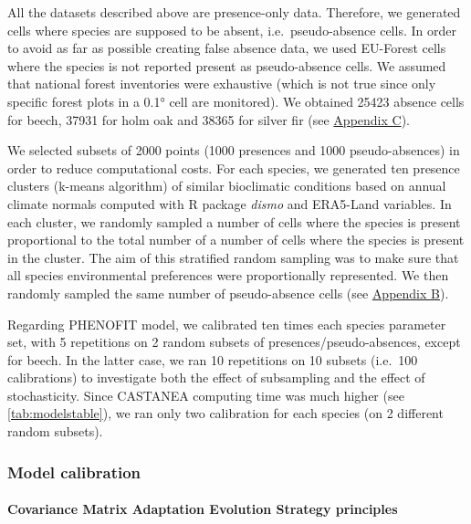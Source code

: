 All the datasets described above are presence-only data. Therefore, we
generated cells where species are supposed to be absent,
i.e.~pseudo-absence cells. In order to avoid as far as possible creating
false absence data, we used EU-Forest cells where the species is not
reported present as pseudo-absence cells. We assumed that national
forest inventories were exhaustive (which is not true since only
specific forest plots in a 0.1° cell are monitored). We obtained 25423
absence cells for beech, 37931 for holm oak and 38365 for silver fir
(see \hyperref[chap1:appendixC]{Appendix C}).

We selected subsets of 2000 points (1000 presences and 1000
pseudo-absences) in order to reduce computational costs. For each
species, we generated ten presence clusters (k-means algorithm) of
similar bioclimatic conditions based on annual climate normals computed
with R package \emph{dismo} \citep{Hijmans2021} and ERA5-Land variables. In each cluster, we
randomly sampled a number of cells where the species is present
proportional to the total number of a number of cells where the species
is present in the cluster. The aim of this stratified random sampling
was to make sure that all species environmental preferences were
proportionally represented. We then randomly sampled the same number of
pseudo-absence cells (see \hyperref[chap1:appendixB]{Appendix B}).

Regarding PHENOFIT model, we calibrated ten times each species parameter
set, with 5 repetitions on 2 random subsets of
presences/pseudo-absences, except for beech. In the latter case, we ran
10 repetitions on 10 subsets (i.e.~100 calibrations) to investigate both
the effect of subsampling and the effect of stochasticity. Since
CASTANEA computing time was much higher (see \autoref{tab:modelstable}),
we ran only two calibration for each species (on 2 different random
subsets).

\clearpage

\subsubsection{Model calibration}\label{model-calibration}

\paragraph{Covariance Matrix Adaptation Evolution Strategy
principles}\label{covariance-matrix-adaptation-evolution-strategy-principles}


